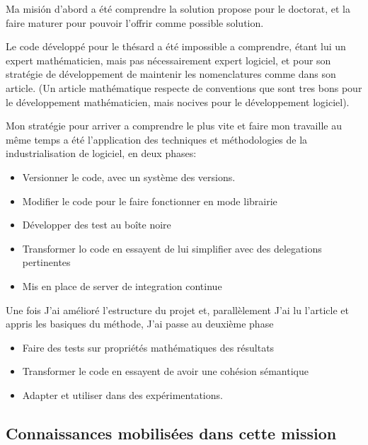 \documentclass{resume} %
\begin{document}
		Ma misión d'abord a été comprendre la solution propose pour le doctorat, et la faire maturer pour pouvoir l'offrir comme possible solution.  

		Le code développé pour le thésard  a été impossible a comprendre, étant lui un expert mathématicien, mais pas nécessairement expert logiciel, et pour son stratégie  de développement de maintenir les nomenclatures comme dans son article. (Un article mathématique respecte de conventions que sont tres bons pour le développement mathématicien, mais nocives pour le développement logiciel). 

		Mon stratégie pour arriver a comprendre le plus vite et faire mon travaille au même temps a été l'application des techniques et méthodologies de la industrialisation de logiciel, en deux phases: 

		 \begin{itemize} 
				\item Versionner le code, avec un système des versions.
				\item Modifier le code pour le faire fonctionner en mode librairie 
				\item Développer des test au boîte noire
				\item Transformer lo code en essayent de lui simplifier avec des delegations pertinentes 
				\item Mis en place de server de integration continue
		\end {itemize}

		Une fois J'ai amélioré l'estructure du projet et, parallèlement J'ai lu l'article et appris les basiques du méthode, J'ai passe au deuxième phase 

		 \begin{itemize} 
				\item Faire des tests sur propriétés mathématiques des résultats   
				\item Transformer le code en essayent de avoir une cohésion sémantique 
				\item Adapter et utiliser dans des expérimentations.
		\end {itemize}

	
	\subsection {Connaissances mobilisées dans cette mission }
\end{document}
